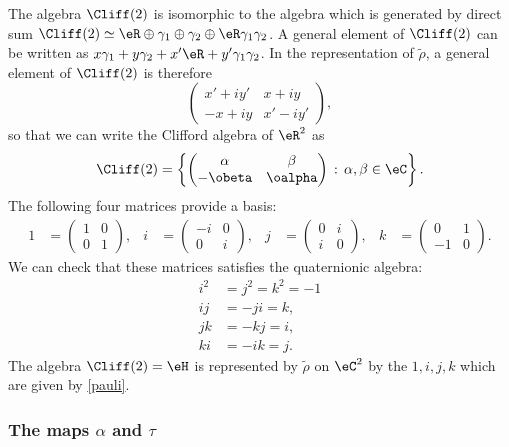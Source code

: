 The algebra $\Cliff(2)$ is isomorphic to the algebra which is generated by direct sum $\Cliff(2)\simeq\eR\oplus\gamma_1\oplus\gamma_2\oplus\eR\gamma_1\gamma_2$. A general element of $\Cliff(2)$ can be written as $x\gamma_1+y\gamma_2+x'\eR+y'\gamma_1\gamma_2$. In the representation of $\tilde\rho$, a general element of $\Cliff(2)$ is therefore
\[\begin{pmatrix}
x'+iy' & x+iy \\
-x+iy & x'-iy'
\end{pmatrix},\] so that we can write the Clifford algebra of $\eR^2$ as
\[
\Cliff(2)=\left\{\begin{pmatrix}
 \alpha & \beta \\
 -\obeta & \oalpha
 \end{pmatrix}\,:\,\alpha,\beta\in\eC\right\}.
\]
The following four matrices provide a basis:
\begin{align}\label{pauli}
1&=\begin{pmatrix}
1 & 0 \\
0 & 1
\end{pmatrix}, &i&=\begin{pmatrix}
-i & 0 \\
0 & i
\end{pmatrix},&j&=\begin{pmatrix}
0 & i \\
i & 0
\end{pmatrix},&k&=\begin{pmatrix}
0 & 1 \\
-1 & 0
\end{pmatrix}.
\end{align}
We can check that these matrices satisfies the quaternionic algebra:
\begin{equation}
\begin{split}
i^2&=j^2=k^2=-1\\
ij &=-ji=k,\\
jk &=-kj=i,\\
ki &=-ik=j.
\end{split}
\end{equation}
The algebra $\Cliff(2)=\eH$ is represented by $\tilde\rho$ on $\eC^2$ by the  $1,i,j,k$ which are given by \eqref{pauli}.

\subsubsection{The maps \texorpdfstring{$\alpha$}{a} and \texorpdfstring{$\tau$}{t}}

